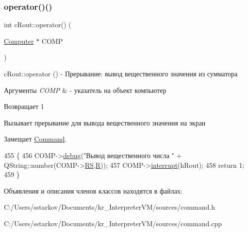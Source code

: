 \subsubsection{\texorpdfstring{operator()()}{operator()()}}
{\footnotesize\ttfamily int c\+Rout\+::operator() (\begin{DoxyParamCaption}\item[{\hyperlink{class_computer}{Computer} $\ast$}]{C\+O\+MP }\end{DoxyParamCaption})\hspace{0.3cm}{\ttfamily [virtual]}}



c\+Rout\+::operator () -\/ Прерывание\+: вывод вещественного значения из сумматора 


\begin{DoxyParams}{Аргументы}
{\em C\+O\+MP} & -\/ указатель на объект компьютер \\
\hline
\end{DoxyParams}
\begin{DoxyReturn}{Возвращает}
1
\end{DoxyReturn}
Вызывает прерывание для вывода вещественного значения на экран 

Замещает \hyperlink{class_command_a79939b66f3de892e91d7710844294716}{Command}.


\begin{DoxyCode}
455 \{
456     COMP->\hyperlink{class_computer_a10ca6c6b200630119201de16d7368e0f}{debug}(\textcolor{stringliteral}{"Вывод вещественного числа "} + QString::number(COMP->\hyperlink{class_computer_a874503110664b3cf821118d2ce9c2b96}{RS}.\hyperlink{union_computer_1_1data_acbf8c96e22bd094bcbb4014818e3570d}{R}));
457     COMP->\hyperlink{class_computer_aa57b0ed2f3a9b168c2924174ec524bd4}{interrupt}(hRout);
458     \textcolor{keywordflow}{return} 1;
459 \}
\end{DoxyCode}


Объявления и описания членов классов находятся в файлах\+:\begin{DoxyCompactItemize}
\item 
C\+:/\+Users/sstarkov/\+Documents/kr\+\_\+\+Interpreter\+V\+M/sources/command.\+h\item 
C\+:/\+Users/sstarkov/\+Documents/kr\+\_\+\+Interpreter\+V\+M/sources/command.\+cpp\end{DoxyCompactItemize}

